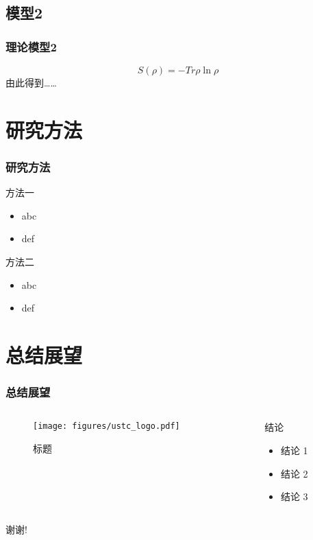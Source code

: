 \documentclass[12pt]{ctexbeamer}
\begin{document}
\subsection{模型2}
\begin{frame}
  \frametitle{理论模型2}
  \begin{equation*}
    S\left(\rho\right)=-Tr\rho\ln\rho
  \end{equation*}
  \pause
  由此得到……

\end{frame}


\section{研究方法}

\begin{frame}
  \frametitle{研究方法}
  \begin{block}{方法一}
    \begin{itemize}
      \item abc
      \item def
    \end{itemize}
  \end{block}
  \pause
  \begin{block}{方法二}
    \begin{itemize}
      \item abc
      \item def
    \end{itemize}
  \end{block}
\end{frame}


\section{总结展望}

\begin{frame}
  \frametitle{总结展望}
  \begin{columns}
    \begin{column}{0.50\textwidth}
      \begin{figure}
        \texttt{[image: figures/ustc\_logo.pdf]}
        \caption{标题}
      \end{figure}
    \end{column}
    \begin{column}{0.50\textwidth}
      \begin{block}{结论}
        \begin{itemize}
          \item 结论 1
          \item 结论 2
          \item 结论 3
        \end{itemize}
      \end{block}
    \end{column}
  \end{columns}
\end{frame}

\begin{frame}
  \centerline{\Large 谢谢!}
\end{frame}
\end{document}
